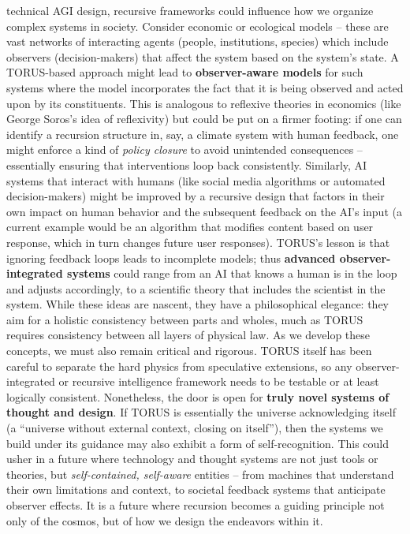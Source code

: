 \documentclass[
]{article}
\begin{document}
\begin{itemize}
  technical AGI design, recursive frameworks could influence how we
  organize complex systems in society. Consider economic or ecological
  models -- these are vast networks of interacting agents (people,
  institutions, species) which include observers (decision-makers) that
  affect the system based on the system's state. A TORUS-based approach
  might lead to \textbf{observer-aware models} for such systems where
  the model incorporates the fact that it is being observed and acted
  upon by its constituents. This is analogous to reflexive theories in
  economics (like George Soros's idea of reflexivity) but could be put
  on a firmer footing: if one can identify a recursion structure in,
  say, a climate system with human feedback, one might enforce a kind of
  \emph{policy closure} to avoid unintended consequences -- essentially
  ensuring that interventions loop back consistently. Similarly, AI
  systems that interact with humans (like social media algorithms or
  automated decision-makers) might be improved by a recursive design
  that factors in their own impact on human behavior and the subsequent
  feedback on the AI's input (a current example would be an algorithm
  that modifies content based on user response, which in turn changes
  future user responses). TORUS's lesson is that ignoring feedback loops
  leads to incomplete models; thus \textbf{advanced observer-integrated
  systems} could range from an AI that knows a human is in the loop and
  adjusts accordingly, to a scientific theory that includes the
  scientist in the system. While these ideas are nascent, they have a
  philosophical elegance: they aim for a holistic consistency between
  parts and wholes, much as TORUS requires consistency between all
  layers of physical law\hspace{0pt}. As we develop these concepts, we
  must also remain critical and rigorous. TORUS itself has been careful
  to separate the hard physics from speculative extensions\hspace{0pt},
  so any observer-integrated or recursive intelligence framework needs
  to be testable or at least logically consistent. Nonetheless, the door
  is open for \textbf{truly novel systems of thought and design}. If
  TORUS is essentially the universe acknowledging itself (a ``universe
  without external context, closing on itself''\hspace{0pt}), then the
  systems we build under its guidance may also exhibit a form of
  self-recognition. This could usher in a future where technology and
  thought systems are not just tools or theories, but
  \emph{self-contained, self-aware} entities -- from machines that
  understand their own limitations and context, to societal feedback
  systems that anticipate observer effects. It is a future where
  recursion becomes a guiding principle not only of the cosmos, but of
  how we design the endeavors within it.
\end{itemize}
\end{document}
